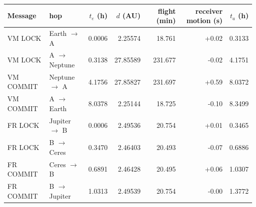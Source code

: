 \par\noindent
\begin{tabular}{llrrrrr}
\toprule
Message & hop & $t_e$ (h) & $d$ (AU) & flight (min) & receiver motion (s) & $t_a$ (h)\\
\midrule
VM LOCK & Earth $\to$ A & 0.0006 & 2.25574 & 18.761 & +0.02 & 0.3133\\
VM LOCK & A $\to$ Neptune & 0.3138 & 27.85589 & 231.677 & -0.02 & 4.1751\\
VM COMMIT & Neptune $\to$ A & 4.1756 & 27.85827 & 231.697 & +0.59 & 8.0372\\
VM COMMIT & A $\to$ Earth & 8.0378 & 2.25144 & 18.725 & -0.10 & 8.3499\\
FR LOCK & Jupiter $\to$ B & 0.0006 & 2.49536 & 20.754 & +0.01 & 0.3465\\
FR LOCK & B $\to$ Ceres & 0.3470 & 2.46403 & 20.493 & -0.07 & 0.6886\\
FR COMMIT & Ceres $\to$ B & 0.6891 & 2.46428 & 20.495 & +0.06 & 1.0307\\
FR COMMIT & B $\to$ Jupiter & 1.0313 & 2.49539 & 20.754 & -0.00 & 1.3772\\
\bottomrule
\end{tabular}\par
